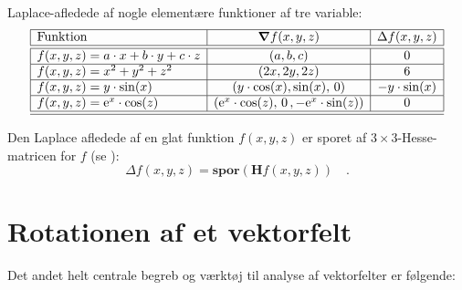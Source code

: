 \begin{example}\label{exampLaplacians}
Laplace-afledede af nogle elementære funktioner af tre variable:
\begin{equation}
\begin{array}{|l|c|c|}
  \hline
 \textrm{Funktion} & \bm{\nabla}f(x,y,z) & \Delta f(x,y,z) \\ \hline \hline
 f(x,y,z)= a\cdot x+b\cdot y+c\cdot z & (a,b,c)   & 0             \\ \hline
 f(x,y,z)= x^{2} + y^{2} + z^{2} & (2x, 2y, 2z) & 6                \\ \hline
  f(x,y,z)= y\cdot \sin(x) & (y\cdot \cos(x), \sin(x), \, 0) & -y\cdot \sin(x)                \\ \hline
   f(x,y,z)= \mathrm{e}^{x}\cdot \cos(z) & (\mathrm{e}^{x} \cdot \cos(z), \, 0 \, , -\mathrm{e}^{x} \cdot \sin(z))&        0     \\ \hline
 \hline
\end{array}
\end{equation}
\end{example}

\begin{aha}
Den Laplace afledede af en glat funktion $f(x,y,z)$ er sporet af $3 \times 3$-Hesse-matricen for $f$ (se ):
\begin{equation}
\Delta f(x,y,z) = \textbf{spor}(\bm{H}f(x,y,z)) \quad .
\end{equation}
\end{aha}






\section{Rotationen af et vektorfelt} \label{secRot}

Det andet helt centrale begreb og værktøj til analyse af vektorfelter er følgende:

